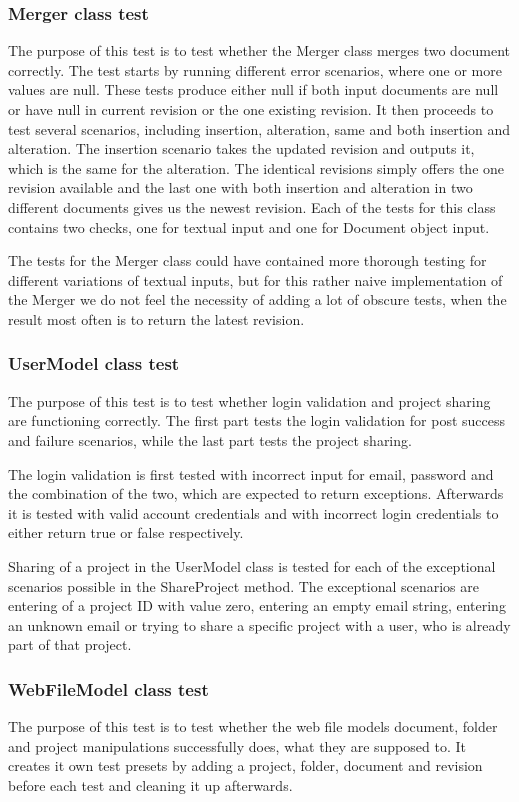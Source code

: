 \subsubsection{Merger class test}
The purpose of this test is to test whether the Merger class merges two document correctly. The test starts by running different error scenarios, where one or more values are null. These tests produce either null if both input documents are null or have null in current revision or the one existing revision.
It then proceeds to test several scenarios, including insertion, alteration, same and both insertion and alteration. The insertion scenario takes the updated revision and outputs it, which is the same for the alteration. The identical revisions simply offers the one revision available and the last one with both insertion and alteration in two different documents gives us the newest revision. Each of the tests for this class contains two checks, one for textual input and one for Document object input.

The tests for the Merger class could have contained more thorough testing for different variations of textual inputs, but for this rather naive implementation of the Merger we do not feel the necessity of adding a lot of obscure tests, when the result most often is to return the latest revision.

\subsubsection{UserModel class test}
The purpose of this test is to test whether login validation and project sharing are functioning correctly. The first part tests the login validation for post success and failure scenarios, while the last part tests the project sharing.

The login validation is first tested with incorrect input for email, password and the combination of the two, which are expected to return exceptions. Afterwards it is tested with valid account credentials and with incorrect login credentials to either return true or false respectively.

Sharing of a project in the UserModel class is tested for each of the exceptional scenarios possible in the ShareProject method. The exceptional scenarios are entering of a project ID with value zero, entering an empty email string, entering an unknown email or trying to share a specific project with a user, who is already part of that project.

\subsubsection{WebFileModel class test}
The purpose of this test is to test whether the web file models document, folder and project manipulations successfully does, what they are supposed to. It creates it own test presets by adding a project, folder, document and revision before each test and cleaning it up afterwards.

